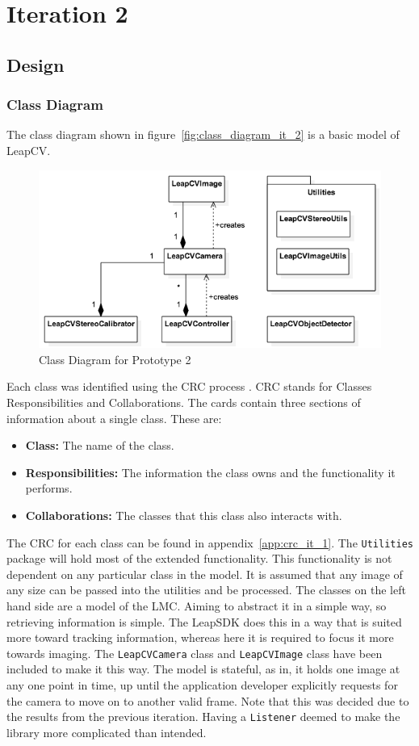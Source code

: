 \documentclass[11pt,oneside]{report}
\newcommand\code[1]{\texttt{#1}}
\begin{document}
	\section{Iteration 2}\label{sec:p2}
		\subsection{Design}
		\subsubsection{Class Diagram}
		The class diagram shown in figure~\ref{fig:class_diagram_it_2} is a basic model of LeapCV.
		\begin{figure}
		\centering
    			\includegraphics[width=\textheight, angle=90]{class_diagram_it_2}
    			\caption{Class Diagram for Prototype 2 \protect {\label{fig:class_diagram_it_2}}}
		\end{figure}			
		Each class was identified using the CRC process \cite{web:crc}. 
		CRC stands for Classes Responsibilities and Collaborations.
		The cards contain three sections of information about a single class.
		These are:
		\begin{itemize}
			\item \textbf{Class:} The name of the class.
			\item \textbf{Responsibilities:} The information the class owns and the functionality it performs.
			\item \textbf{Collaborations:} The classes that this class also interacts with.
		\end{itemize}
		
		The CRC for each class can be found in appendix~\ref{app:crc_it_1}.
		The \code{Utilities} package will hold most of the extended functionality.
		This functionality is not dependent on any particular class in the model.
		It is assumed that any image of any size can be passed into the utilities and be processed.
		The classes on the left hand side are a model of the LMC.
		Aiming to abstract it in a simple way, so retrieving information is simple.
		The LeapSDK does this in a way that is suited more toward tracking information, whereas here it is required to focus it more towards imaging.
		The \code{LeapCVCamera} class and \code{LeapCVImage} class have been included to make it this way.
		The model is stateful, as in, it holds one image at any one point in time, up until the application developer explicitly requests for the camera to move on to another valid frame.
		Note that this was decided due to the results from the previous iteration.
		Having a \code{Listener} deemed to make the library more complicated than intended.
\end{document}
